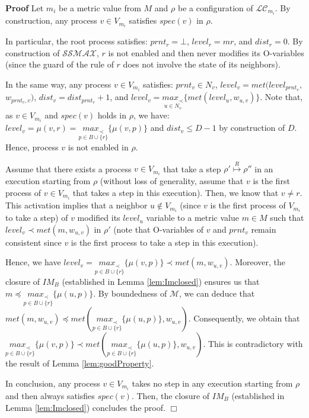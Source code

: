 \documentclass[11pt]{article}
\newenvironment{proof}{\noindent\textbf{Proof}}{\hfill\qed}
\newcommand{\qed}{\hfill$\Box$}
\begin{document}
\begin{proof}
Let $m_i$ be a metric value from $M$ and $\rho$ be a configuration of $\mathcal{LC}_{m_i}$. By construction, any process $v\in V_{m_i}$ satisfies $spec(v)$ in $\rho$. 

In particular, the root process satisfies: $prnt_r=\bot$, $level_r=mr$, and $dist_r=0$. By construction of $\mathcal{SSMAX}$, $r$ is not enabled and then never modifies its O-variables (since the guard of the rule of $r$ does not involve the state of its neighbors). 

In the same way, any process $v\in V_{m_i}$ satisfies: $prnt_v\in N_v$, $level_v=met(level_{prnt_v},$ $w_{prnt_v,v})$, $dist_v=dist_{prnt_v}+1$, and $level_v=\underset{u\in N_v}{max_\prec}\{met(level_u,w_{u,v})\}$. Note that, as $v\in V_{m_i}$ and $spec(v)$ holds in $\rho$, we have: $level_v=\mu(v,r)=\underset{p\in B\cup\{r\}}{max_\prec}\{\mu(v,p)\}$ and $dist_v\leq D-1$ by construction of $D$. Hence, process $v$ is not enabled in $\rho$.

Assume that there exists a process $v\in V_{m_i}$ that take a step $\rho' \stackrel{R}{\mapsto} \rho''$ in an execution starting from $\rho$ (without loss of generality, assume that $v$ is the first process of $v\in V_{m_i}$ that takes a step in this execution). Then, we know that $v\neq r$. This activation implies that a neighbor $u\notin V_{m_i}$ (since $v$ is the first process of $V_{m_i}$ to take a step) of $v$ modified its $level_u$ variable to a metric value $m\in M$ such that $level_v\prec met(m,w_{u,v})$ in $\rho'$ (note that O-variables of $v$ and $prnt_v$ remain consistent since $v$ is the first process to take a step in this execution).

Hence, we have $level_v=\underset{p\in B\cup\{r\}}{max_\prec}\{\mu(v,p)\}\prec met(m,w_{u,v})$. Moreover, the closure of $IM_B$ (established in Lemma \ref{lem:Imclosed}) ensures us that $m\preceq \underset{p\in B\cup\{r\}}{max_\prec}\{\mu(u,p)\}$. By boundedness of $\mathcal{M}$, we can deduce that $met(m,w_{u,v})\preceq met(\underset{p\in B\cup\{r\}}{max_\prec}\{\mu(u,p)\},w_{u,v})$. Consequently, we obtain that $\underset{p\in B\cup\{r\}}{max_\prec}\{\mu(v,p)\}\prec met(\underset{p\in B\cup\{r\}}{max_\prec}\{\mu(u,p)\},w_{u,v})$. This is contradictory with the result of Lemma \ref{lem:goodProperty}.

In conclusion, any process $v\in V_{m_i}$ takes no step in any execution starting from $\rho$ and then always satisfies $spec(v)$. Then, the closure of $IM_B$ (established in Lemma \ref{lem:Imclosed}) concludes the proof.
\end{proof}
\end{document}
